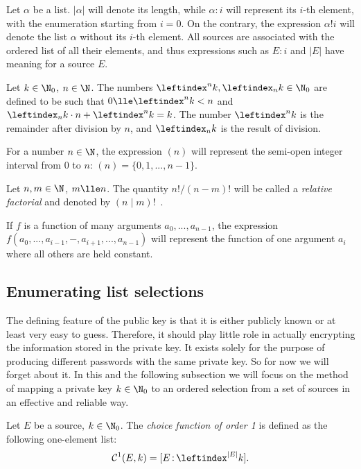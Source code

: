 \documentclass[12pt, a4paper]{article}
\renewcommand{\C}{\mathcal{C}}
\newcommand{\lli}[1]{\leftindex_{#1}}
\newcommand{\lui}[1]{\leftindex^{#1}}
\newcommand{\elt}{\mathop{:}}
\newcommand{\wo}{\mathop{!}}
\begin{document}
Let $ \alpha $ be a list. $ |\alpha| $ will denote its length, while $ \alpha \elt i $ will represent its $ i $-th element, with the enumeration starting from $ i = 0 $. On the contrary, the expression $ \alpha \wo i $ will denote the list $ \alpha $ without its $ i $-th element. All sources are associated with the ordered list of all their elements, and thus expressions such as $ E \elt i $ and $ |E| $ have meaning for a source $ E $.


Let $ k \in \N_0 $, $ n \in \N $. The numbers $ \lui{n}k, \lli{n}k \in \N_0 $ are defined to be such that $ 0 \lle \lui{n}k < n $ and $ \lli{n}k \cdot n + \lui{n}k = k $. The number $ \lui{n}k $ is the remainder after division by $ n $, and $ \lli{n}k $ is the result of division.

For a number $ n \in \N $, the expression $ (n) $ will represent the semi-open integer interval from 0 to $ n $: $ (n) = \{0, 1, ..., n-1\} $.

Let $ n, m \in \N $, $ m \lle n $. The quantity $ n!/(n-m)! $ will be called a \emph{relative factorial} and denoted by $ (n \mid m)! $\ .

If $ f $ is a function of many arguments $ a_0, ..., a_{n-1} $, the expression $ f(a_0, ..., a_{i-1}, -, a_{i+1}, ..., a_{n-1}) $ will represent the function of one argument $ a_i $ where all others are held constant.

\subsection{Enumerating list selections}

The defining feature of the public key is that it is either publicly known or at least very easy to guess. Therefore, it should play little role in actually encrypting the information stored in the private key. It exists solely for the purpose of producing different passwords with the same private key. So for now we will forget about it. In this and the following subsection we will focus on the method of mapping a private key $ k \in \N_0 $ to an ordered selection from a set of sources in an effective and reliable way.

\begin{definition}
    Let $ E $ be a source, $ k \in \N_0 $. The \emph{choice function of order 1} is defined as the following one-element list:
    \[ \C^1(E, k) = [E \elt \lui{|E|}k]. \]
\end{definition}
\end{document}
